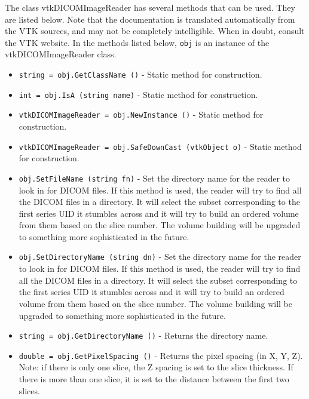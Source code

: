 The class vtkDICOMImageReader has several methods that can be used.
  They are listed below.
Note that the documentation is translated automatically from the VTK sources,
and may not be completely intelligible.  When in doubt, consult the VTK website.
In the methods listed below, \verb|obj| is an instance of the vtkDICOMImageReader class.
\begin{itemize}
\item  \verb|string = obj.GetClassName ()| -  Static method for construction.

\item  \verb|int = obj.IsA (string name)| -  Static method for construction.

\item  \verb|vtkDICOMImageReader = obj.NewInstance ()| -  Static method for construction.

\item  \verb|vtkDICOMImageReader = obj.SafeDownCast (vtkObject o)| -  Static method for construction.

\item  \verb|obj.SetFileName (string fn)| -  Set the directory name for the reader to look in for DICOM
 files. If this method is used, the reader will try to find
 all the DICOM files in a directory. It will select the subset
 corresponding to the first series UID it stumbles across and
 it will try to build an ordered volume from them based on
 the slice number. The volume building will be upgraded to
 something more sophisticated in the future.

\item  \verb|obj.SetDirectoryName (string dn)| -  Set the directory name for the reader to look in for DICOM
 files. If this method is used, the reader will try to find
 all the DICOM files in a directory. It will select the subset
 corresponding to the first series UID it stumbles across and
 it will try to build an ordered volume from them based on
 the slice number. The volume building will be upgraded to
 something more sophisticated in the future.

\item  \verb|string = obj.GetDirectoryName ()| -  Returns the directory name.

\item  \verb|double = obj.GetPixelSpacing ()| -  Returns the pixel spacing (in X, Y, Z).
 Note: if there is only one slice, the Z spacing is set to the slice
 thickness. If there is more than one slice, it is set to the distance
 between the first two slices.


\end{itemize}

